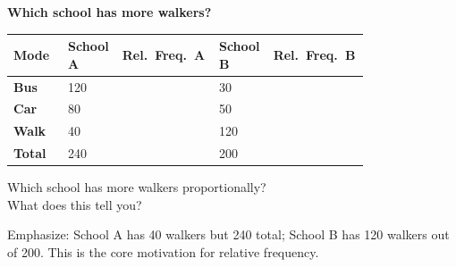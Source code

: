 \documentclass[10pt]{article}
\begin{document}
\vspace{0.1in}

\begin{hookbox}
\small\textbf{Which school has more walkers?}

\vspace{8pt}
\renewcommand{\arraystretch}{1.6}
\begin{tabularx}{\linewidth}{@{} >{\bfseries}p{0.15\linewidth}
    C{0.12\linewidth} C{0.2\linewidth}
    C{0.12\linewidth} C{0.2\linewidth} @{}}
\textbf{Mode} & \textbf{School A} & \textbf{Rel.\ Freq.\ A}
              & \textbf{School B} & \textbf{Rel.\ Freq.\ B} \\
\midrule
Bus  & 120 &  & 30  &  \\
Car  & 80  &  & 50  &  \\
Walk & 40  &  & 120 &  \\
\midrule
{}\textbf{Total} & 240 &  & 200 &  \\
\end{tabularx}

\vspace{10pt}
Which school has more walkers proportionally?\quad
{}\\[6pt]
What does this tell you?\quad
{}

\begin{teachernote}
Emphasize: School A has 40 walkers but 240 total; School B has 120 walkers out of 200.
This is the core motivation for relative frequency.
\end{teachernote}
\end{hookbox}

\vspace{0.1in}
\end{document}
